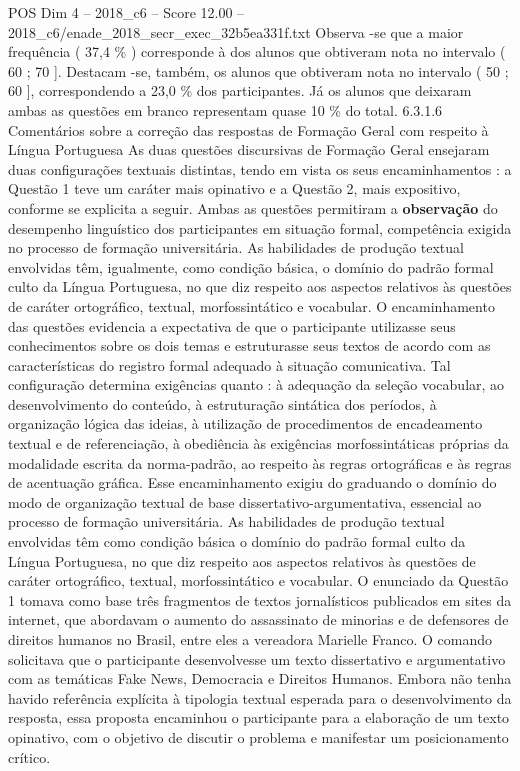 \begin{textsample}{POS Dim 4 – 2018\_c6 – Score 12.00 – 2018\_c6/enade\_2018\_secr\_exec\_32b5ea331f.txt}
Observa -se que a maior frequência ( 37,4 \% ) corresponde à dos alunos que obtiveram nota no intervalo ( 60 ; 70 ].
Destacam -se, também, os alunos que obtiveram nota no intervalo ( 50 ; 60 ], correspondendo a 23,0 \% dos participantes.
Já os alunos que deixaram ambas as questões em branco representam quase 10 \% do total. 6.3.1.6 Comentários sobre a correção das respostas de Formação Geral com respeito à Língua Portuguesa As duas questões discursivas de Formação Geral ensejaram duas configurações textuais distintas, tendo em vista os seus encaminhamentos : a Questão 1 teve um caráter mais opinativo e a Questão 2, mais expositivo, conforme se explicita a seguir.
Ambas as questões permitiram a \textbf{observação} do desempenho linguístico dos participantes em situação formal, competência exigida no processo de formação universitária.
As habilidades de produção textual envolvidas têm, igualmente, como condição básica, o domínio do padrão formal culto da Língua Portuguesa, no que diz respeito aos aspectos relativos às questões de caráter ortográfico, textual, morfossintático e vocabular.
O encaminhamento das questões evidencia a expectativa de que o participante utilizasse seus conhecimentos sobre os dois temas e estruturasse seus textos de acordo com as características do registro formal adequado à situação comunicativa.
Tal configuração determina exigências quanto : à adequação da seleção vocabular, ao desenvolvimento do conteúdo, à estruturação sintática dos períodos, à organização lógica das ideias, à utilização de procedimentos de encadeamento textual e de referenciação, à obediência às exigências morfossintáticas próprias da modalidade escrita da norma-padrão, ao respeito às regras ortográficas e às regras de acentuação gráfica.
Esse encaminhamento exigiu do graduando o domínio do modo de organização textual de base dissertativo-argumentativa, essencial ao processo de formação universitária.
As habilidades de produção textual envolvidas têm como condição básica o domínio do padrão formal culto da Língua Portuguesa, no que diz respeito aos aspectos relativos às questões de caráter ortográfico, textual, morfossintático e vocabular.
O enunciado da Questão 1 tomava como base três fragmentos de textos jornalísticos publicados em sites da internet, que abordavam o aumento do assassinato de minorias e de defensores de direitos humanos no Brasil, entre eles a vereadora Marielle Franco.
O comando solicitava que o participante desenvolvesse um texto dissertativo e argumentativo com as temáticas Fake News, Democracia e Direitos Humanos.
Embora não tenha havido referência explícita à tipologia textual esperada para o desenvolvimento da resposta, essa proposta encaminhou o participante para a elaboração de um texto opinativo, com o objetivo de discutir o problema e manifestar um posicionamento crítico.

\end{textsample}

